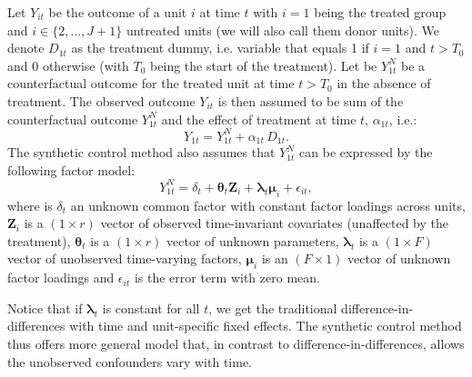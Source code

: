 
Let $Y_{it}$ be the outcome of a unit $i$ at time $t$ with $i = 1$ being the treated group and $i \in \{ 2, \dots, J + 1 \}$ untreated units (we will also call them donor units).  We
denote $D_{1t}$ as the treatment dummy, i.e. variable that equals 1 if $i = 1$ and $t > T_0$ and 0 otherwise (with $T_0$ being the start of the treatment). 
Let be $Y_{1t}^N$ be a counterfactual outcome for the treated unit at time $t > T_0$ in the absence of treatment. 
The observed outcome $Y_{it}$ is then assumed to be  sum of the counterfactual outcome $Y_{1t}^N$ and the effect of treatment at time $t$, $\alpha_{1t}$, i.e.:
\begin{equation}
    Y_{1t} = Y_{1t}^N + \alpha_{1t} \, D_{1t}.
\end{equation}
The synthetic control method also assumes that $Y_{1t}^N$  can be expressed by the following factor model:
\begin{equation} \label{factor_model}
   Y_{1t}^N = \delta_t + \boldsymbol{\theta}_t \boldsymbol{Z}_i +
   \boldsymbol{\lambda}_t \boldsymbol{\mu}_i + \epsilon_{it},
\end{equation}
where is $\delta_t$ an unknown common factor with constant factor
loadings across units, $\boldsymbol{Z}_i$ is a
$(1 \times r)$ vector of observed time-invariant covariates (unaffected by the treatment),  $\boldsymbol{\theta}_t$ is a $(1 \times r)$ vector of
unknown parameters, $\boldsymbol{\lambda}_t$ is a $(1 \times F)$ vector of unobserved time-varying factors, $\boldsymbol{\mu}_i$ is an $(F \times 1)$ vector of unknown factor loadings
and $\epsilon_{it}$ is the error term with zero mean.

Notice that if $\boldsymbol{\lambda}_t$ is constant  for all $t$, we get the traditional
difference-in-differences with time and unit-specific fixed effects. 
The synthetic control method thus offers more general model that, in contrast to difference-in-differences, allows the unobserved confounders vary with time.


